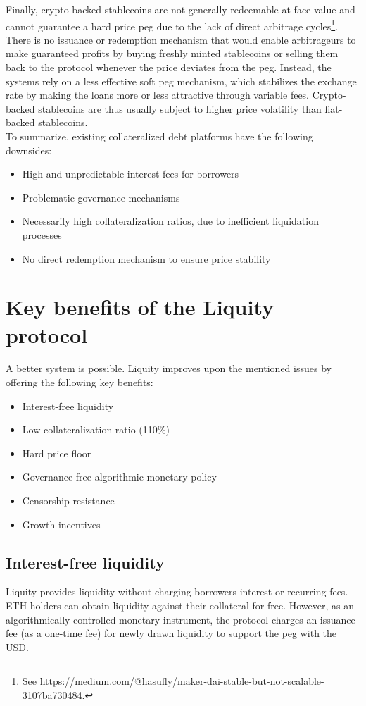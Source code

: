 \documentclass{article}
\begin{document}
Finally, crypto-backed stablecoins are not generally redeemable at face value and cannot guarantee a hard price peg due to the lack of direct arbitrage cycles\footnote{See https://medium.com/@hasufly/maker-dai-stable-but-not-scalable-3107ba730484.}. There is no issuance or redemption mechanism that would enable arbitrageurs to make guaranteed profits by buying freshly minted stablecoins or selling them back to the protocol whenever the price deviates from the peg. Instead, the systems rely on a less effective soft peg mechanism, which stabilizes the exchange rate by making the loans more or less attractive through variable fees. Crypto-backed stablecoins are thus usually subject to higher price volatility than fiat-backed stablecoins.\\

To summarize, existing collateralized debt platforms have the following downsides:
\begin{itemize}
    \item High and unpredictable interest fees for borrowers
    \item Problematic governance mechanisms
    \item Necessarily high collateralization ratios, due to inefficient liquidation processes
    \item No direct redemption mechanism to ensure price stability
\end{itemize}
 
\section{Key benefits of the Liquity protocol}
A better system is possible. Liquity improves upon the mentioned issues by offering the following key benefits:
\begin{itemize}
    \item Interest-free liquidity
    \item Low collateralization ratio (110\%)
    \item Hard price floor
    \item Governance-free algorithmic monetary policy
    \item Censorship resistance
    \item Growth incentives
\end{itemize}

\subsection{Interest-free liquidity}
Liquity provides liquidity without charging borrowers interest or recurring fees. ETH holders can obtain liquidity against their collateral for free. However, as an algorithmically controlled monetary instrument, the protocol charges an issuance fee (as a one-time fee) for newly drawn liquidity to support the peg with the USD.
\end{document}

